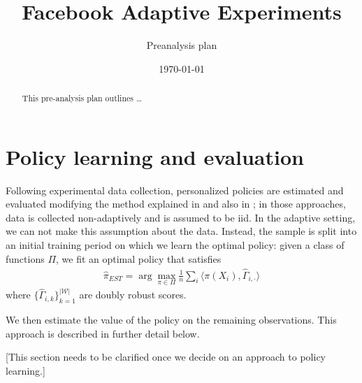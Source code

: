 \documentclass[letterpaper, 12pt, parskip=full, headsepline]{scrartcl}
\title{Facebook Adaptive Experiments}
\subtitle{Preanalysis plan}
\author{ }
\date{\today}
\begin{document}
%
\normalsize%
\maketitle%
\tableofcontents%
\clearpage%


\begin{abstract}
This pre-analysis plan outlines \dots
\end{abstract}




\clearpage



\clearpage
\appendix

\section{Policy learning and evaluation}

Following experimental data collection, personalized policies are estimated and evaluated modifying the method explained in \cite{athey2017efficient} and also in \cite{zhou2018offline}; in those approaches, data is collected non-adaptively and is assumed to be iid. In the adaptive setting, we can not make this assumption about the data. Instead, the sample is split into an initial training period on which we learn the optimal policy: given a class of functions $\Pi$, we fit an optimal policy that satisfies
\begin{align}
  \hat{\pi}_{EST} = \arg\max_{\pi \in \Pi} \frac{1}{n}\sum_{i} \langle \pi(X_{i}), \hat{\Gamma}_{i,\cdot} \rangle
\end{align}
where $\{\hat{\Gamma}_{i,k}\}_{k=1}^{|\mathcal{W}|}$ are doubly robust scores. 

We then estimate the value of the policy on the remaining observations. This approach is described in further detail below. 

{\color{red} [This section needs to be clarified once we decide on an approach to policy learning.] }
\end{document}
